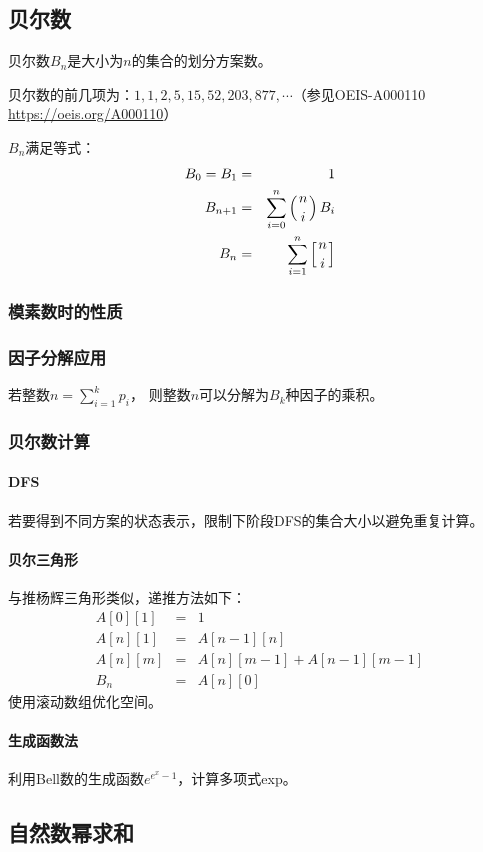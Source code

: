 \subsection{贝尔数}
贝尔数$B_n$是大小为$n$的集合的划分方案数。

贝尔数的前几项为：$1, 1, 2, 5, 15, 52, 203, 877,\cdots$（参见OEIS-A000110\\
\url{https://oeis.org/A000110}）

$B_n$满足等式：
\begin{eqnarray*}
	B_0=B_1&=&1\\
	B_{n+1}&=&\sum_{i=0}^n{\left(n \atop i\right)B_i}\\
	B_n&=&\sum_{i=1}^n{\left[n \atop i\right]}
\end{eqnarray*}

\subsubsection{模素数时的性质}

\subsubsection{因子分解应用}
若整数$\displaystyle n=\sum_{i=1}^k{p_i}$，
则整数$n$可以分解为$B_k$种因子的乘积。
\subsubsection{贝尔数计算}
\paragraph{DFS}若要得到不同方案的状态表示，限制下阶段DFS的集合大小以避免重复计算。
\paragraph{贝尔三角形}
与推杨辉三角形类似，递推方法如下：
\begin{eqnarray*}
	A[0][1]&=&1\\
	A[n][1]&=&A[n-1][n]\\
	A[n][m]&=&A[n][m-1]+A[n-1][m-1]\\
	B_n&=&A[n][0]
\end{eqnarray*}
使用滚动数组优化空间。
\paragraph{生成函数法}
利用Bell数的生成函数$e^{e^x-1}$，计算多项式exp。
\subsection{自然数幂求和}

